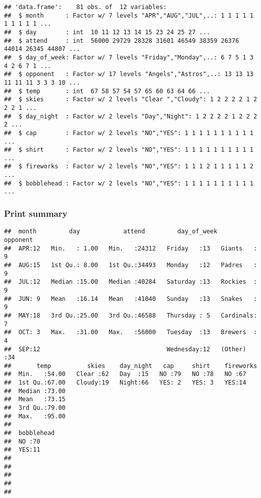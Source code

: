 \documentclass[]{article}
\begin{document}
\begin{verbatim}
## 'data.frame':    81 obs. of  12 variables:
##  $ month      : Factor w/ 7 levels "APR","AUG","JUL",..: 1 1 1 1 1 1 1 1 1 1 ...
##  $ day        : int  10 11 12 13 14 15 23 24 25 27 ...
##  $ attend     : int  56000 29729 28328 31601 46549 38359 26376 44014 26345 44807 ...
##  $ day_of_week: Factor w/ 7 levels "Friday","Monday",..: 6 7 5 1 3 4 2 6 7 1 ...
##  $ opponent   : Factor w/ 17 levels "Angels","Astros",..: 13 13 13 11 11 11 3 3 3 10 ...
##  $ temp       : int  67 58 57 54 57 65 60 63 64 66 ...
##  $ skies      : Factor w/ 2 levels "Clear ","Cloudy": 1 2 2 2 2 1 2 2 2 1 ...
##  $ day_night  : Factor w/ 2 levels "Day","Night": 1 2 2 2 2 1 2 2 2 2 ...
##  $ cap        : Factor w/ 2 levels "NO","YES": 1 1 1 1 1 1 1 1 1 1 ...
##  $ shirt      : Factor w/ 2 levels "NO","YES": 1 1 1 1 1 1 1 1 1 1 ...
##  $ fireworks  : Factor w/ 2 levels "NO","YES": 1 1 1 2 1 1 1 1 1 2 ...
##  $ bobblehead : Factor w/ 2 levels "NO","YES": 1 1 1 1 1 1 1 1 1 1 ...
\end{verbatim}

\hypertarget{print-summary}{%
\subsubsection{Print summary}\label{print-summary}}

\begin{verbatim}
##  month         day            attend         day_of_week      opponent 
##  APR:12   Min.   : 1.00   Min.   :24312   Friday   :13   Giants   : 9  
##  AUG:15   1st Qu.: 8.00   1st Qu.:34493   Monday   :12   Padres   : 9  
##  JUL:12   Median :15.00   Median :40284   Saturday :13   Rockies  : 9  
##  JUN: 9   Mean   :16.14   Mean   :41040   Sunday   :13   Snakes   : 9  
##  MAY:18   3rd Qu.:25.00   3rd Qu.:46588   Thursday : 5   Cardinals: 7  
##  OCT: 3   Max.   :31.00   Max.   :56000   Tuesday  :13   Brewers  : 4  
##  SEP:12                                   Wednesday:12   (Other)  :34  
##       temp          skies    day_night   cap     shirt    fireworks
##  Min.   :54.00   Clear :62   Day  :15   NO :79   NO :78   NO :67   
##  1st Qu.:67.00   Cloudy:19   Night:66   YES: 2   YES: 3   YES:14   
##  Median :73.00                                                     
##  Mean   :73.15                                                     
##  3rd Qu.:79.00                                                     
##  Max.   :95.00                                                     
##                                                                    
##  bobblehead
##  NO :70    
##  YES:11    
##            
##            
##            
##            
## 
\end{verbatim}
\end{document}
